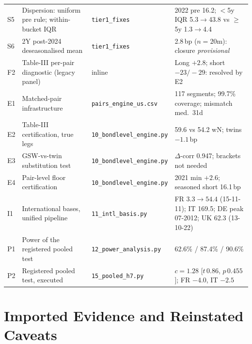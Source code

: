 \documentclass[11pt]{article}
\begin{document}
\begin{table}[h!]
\begin{tabular}{p{0.8cm}p{5.4cm}p{3.2cm}p{4.5cm}}
S5 & Dispersion: uniform pre rule; within-bucket IQR & \texttt{tier1\_fixes} & 2022 pre 16.2; $<$5y IQR 5.3$\to$43.8 vs $\ge$5y 1.3$\to$4.4 \\
S6 & 2Y post-2024 deseasonalised mean & \texttt{tier1\_fixes} & 2.8\,bp ($n=20$m): closure \emph{provisional} \\
F2 & Table-III per-pair diagnostic (legacy panel) & inline & Long $+2.8$; short $-23/-29$: resolved by E2 \\
E1 & Matched-pair infrastructure & \texttt{pairs\_engine\_us.csv} & 117 segments; 99.7\% coverage; mismatch med.\ 31d \\
E2 & Table-III certification, true legs & \texttt{10\_bondlevel\_engine.py} & 59.6 vs 54.2 wN; twins $-1.1$\,bp \\
E3 & GSW-vs-twin substitution test & \texttt{10\_bondlevel\_engine.py} & $\Delta$-corr 0.947; brackets not needed \\
E4 & Pair-level floor certification & \texttt{10\_bondlevel\_engine.py} & 2021 min $+2.6$; seasoned short 16.1\,bp \\
I1 & International bases, unified pipeline & \texttt{11\_intl\_basis.py} & FR $3.3\to54.4$ (15-11-11); IT 169.5; DE peak 07-2012; UK 62.3 (13-10-22) \\
P1 & Power of the registered pooled test & \texttt{12\_power\_analysis.py} & 62.6\% / 87.4\% / 90.6\% \\
P2 & Registered pooled test, executed & \texttt{15\_pooled\_h7.py} & $c=1.28$ [$t\,0.86$, $p\,0.455$]; FR $-4.0$, IT $-2.5$ \\
\bottomrule
\end{tabular}
\end{table}

\section{Imported Evidence and Reinstated Caveats}
\end{document}
